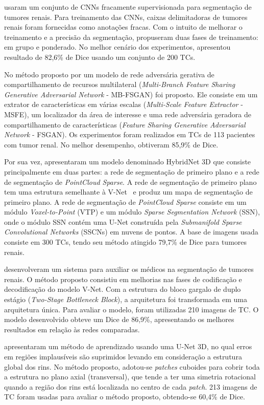  usaram um conjunto de CNNs fracamente supervisionada para segmentação de tumores renais. Para treinamento das CNNs, caixas delimitadoras de tumores renais foram fornecidas como anotações fracas. Com o intuito de melhorar o treinamento e a precisão da segmentação, propuseram duas fases de treinamento: em grupo e ponderado. No melhor cenário dos experimentos, apresentou resultado de 82,6\% de Dice usando um conjunto de 200 TCs.

No método proposto por  um modelo de rede adversária gerativa de compartilhamento de recursos multilateral (\textit{Multi-Branch Feature Sharing Generative Adversarial Network} - MB-FSGAN) foi proposto. Ele consiste em um extrator de características em várias escalas (\textit{Multi-Scale Feature Extractor} - MSFE), um localizador da área de interesse e uma rede adversária geradora de compartilhamento de características (\textit{Feature Sharing Generative Adversarial Network} - FSGAN). Os experimentos foram realizados em TCs de 113 pacientes com tumor renal. No melhor desempenho, obtiveram 85,9\% de Dice.

Por sua vez,  apresentaram um modelo denominado HybridNet 3D que consiste principalmente em duas partes: a rede de segmentação de primeiro plano e a rede de segmentação de \textit{PointCloud Sparse}. A rede de segmentação de primeiro plano tem uma estrutura semelhante à V-Net~\cite{v-net2016} e produz um mapa de segmentação de primeiro plano. A rede de segmentação de \textit{PointCloud Sparse} consiste em um módulo \textit{Voxel-to-Point} (VTP) e um módulo \textit{Sparse Segmentation Network} (SSN), onde o módulo SSN contém uma U-Net construída pela \textit{Submanifold Sparse Convolutional Networks} (SSCNs) em nuvens de pontos. A base de imagens usada consiste em 300 TCs, tendo seu método atingido 79,7\% de Dice para tumores renais.

 desenvolveram um sistema para auxiliar os médicos na segmentação de tumores renais. O método proposto consistiu em melhorias nas fases de codificação e decodificação do modelo V-Net. Com a estrutura do bloco gargalo de duplo estágio (\textit{Two-Stage Bottleneck Block}), a arquitetura foi transformada em uma arquitetura única. Para avaliar o modelo, foram utilizadas 210 imagens de TC. O modelo desenvolvido obteve um Dice de 86,9\%, apresentando os melhores resultados em relação às redes comparadas.

 apresentaram um método de aprendizado usando uma U-Net 3D, no qual erros em regiões implausíveis são suprimidos levando em consideração a estrutura global dos rins. No método proposto, adotou-se \textit{patches} cuboides para cobrir toda a estrutura no plano axial (transversal), que tende a ter uma simetria rotacional quando a região dos rins está localizada no centro de cada \textit{patch}. 213 imagens de TC foram usadas para avaliar o método proposto, obtendo-se 60,4\% de Dice.

